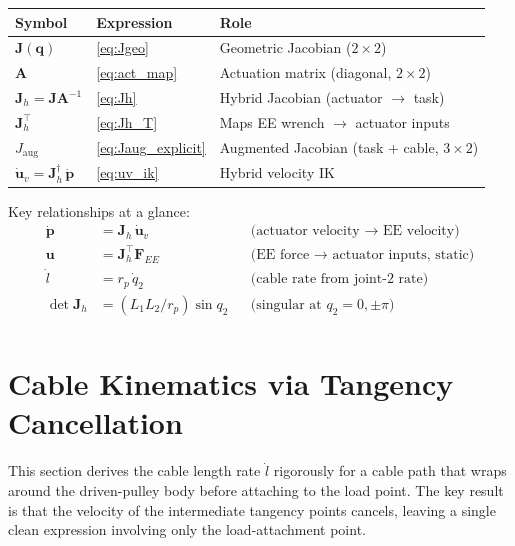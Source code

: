 \documentclass[12pt, a4paper]{article}
\theoremstyle{definition}
\newcommand{\bq}{\bm{q}}
\newcommand{\bp}{\bm{p}}
\newcommand{\bu}{\bm{u}}
\newcommand{\bF}{\bm{F}}
\newcommand{\bJ}{\bm{J}}
\newcommand{\bA}{\bm{A}}
\begin{document}
\begin{center}
  \renewcommand{\arraystretch}{1.5}
  \begin{tabular}{lll}
    \toprule
    Symbol & Expression & Role \\
    \midrule
    $\bJ(\bq)$       & \cref{eq:Jgeo} & Geometric Jacobian ($2\times 2$)\\
    $\bA$            & \cref{eq:act_map} & Actuation matrix (diagonal, $2\times 2$)\\
    $\bJ_h = \bJ\bA^{-1}$ & \cref{eq:Jh} & Hybrid Jacobian (actuator $\to$ task) \\
    $\bJ_h^\top$     & \cref{eq:Jh_T} & Maps EE wrench $\to$ actuator inputs \\
    $J_{\text{aug}}$ & \cref{eq:Jaug_explicit} & Augmented Jacobian (task + cable, $3\times 2$) \\
    $\dot{\bu}_v = \bJ_h^\dag\,\dot{\bp}$ & \cref{eq:uv_ik} & Hybrid velocity IK \\
    \bottomrule
  \end{tabular}
\end{center}

\noindent
Key relationships at a glance:
\begin{align*}
  \dot{\bp}  &= \bJ_h\,\dot{\bu}_v
               &&\text{(actuator velocity $\to$ EE velocity)} \\
  \bu        &= \bJ_h^\top \bF_{EE}
               &&\text{(EE force $\to$ actuator inputs, static)} \\
  \dot{l}    &= r_p\,\dot{q}_2
               &&\text{(cable rate from joint-2 rate)} \\
  \det\bJ_h  &= (L_1 L_2 / r_p)\sin q_2
               &&\text{(singular at } q_2 = 0, \pm\pi) \\
\end{align*}

\section{Cable Kinematics via Tangency Cancellation}
\label{sec:cable_kin_tangency}

This section derives the cable length rate $\dot{l}$ rigorously for a cable path
that wraps around the driven-pulley body before attaching to the load point.  The
key result is that the velocity of the intermediate tangency points cancels,
leaving a single clean expression involving only the load-attachment point.
\end{document}

